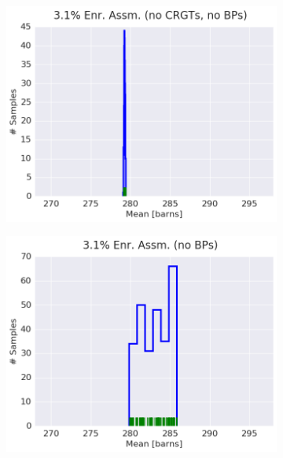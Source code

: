 \begin{figure}[h!]
\centering
\begin{subfigure}{0.5\textwidth}
  \centering
  \includegraphics[width=\linewidth]{figures/patterns/assm-3.1-inf/hist-kde-rug/assm-31-inf-fiss-2}
  \caption{}
  \label{fig:chap9-hist-assm-3.1-inf-fiss}
\end{subfigure}%
\begin{subfigure}{0.5\textwidth}
  \centering
  \includegraphics[width=\linewidth]{figures/patterns/assm-3.1/hist-kde-rug/assm-31-fiss-2}
  \caption{}
  \label{fig:chap9-hist-assm-3.1-fiss}
\end{subfigure}

\end{figure}
